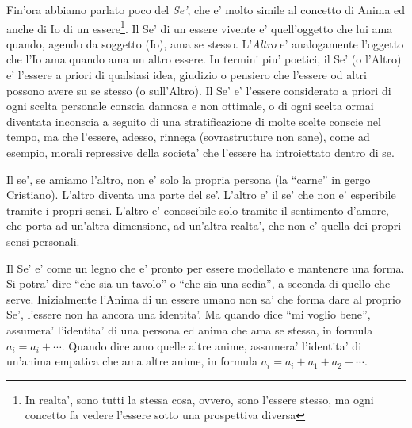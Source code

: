 Fin'ora abbiamo parlato poco del \emph{Se'}, che e' molto simile al concetto di Anima ed anche di Io di un essere\footnote{In realta', sono tutti la stessa cosa, ovvero, sono l'essere stesso, ma ogni concetto fa vedere l'essere sotto una prospettiva diversa}. Il Se' di un essere vivente e' quell'oggetto che lui ama quando, agendo da soggetto (Io), ama se stesso. L'\emph{Altro} e' analogamente l'oggetto che l'Io ama quando ama un altro essere. In termini piu' poetici, il Se' (o l'Altro) e' l'essere a priori di qualsiasi idea, giudizio o pensiero che l'essere od altri possono avere su se stesso (o sull'Altro). Il Se' e' l'essere considerato a priori di ogni scelta personale conscia dannosa e non ottimale, o di ogni scelta ormai diventata inconscia a seguito di una stratificazione di molte scelte conscie nel tempo, ma che l'essere, adesso, rinnega (sovrastrutture non sane), come ad esempio, morali repressive della societa' che l'essere ha introiettato dentro di se. 

Il se', se amiamo l'altro, non e' solo la propria persona (la ``carne'' in gergo Cristiano). L'altro diventa una parte del se'. L'altro e' il se' che non e' esperibile tramite i propri sensi. L'altro e' conoscibile solo tramite il sentimento d'amore, che porta ad un'altra dimensione, ad un'altra realta', che non e' quella dei propri sensi personali. 

Il Se' e' come un legno che e' pronto per essere modellato e mantenere una forma. Si potra' dire ``che sia un tavolo'' o ``che sia una sedia'', a seconda di quello che serve.  Inizialmente l'Anima di un essere umano non sa' che forma dare al proprio Se', l'essere non ha ancora una identita'. Ma quando dice ``mi voglio bene'', assumera' l'identita' di una persona ed anima che ama se stessa, in formula $a_i=a_i+\cdots$. Quando dice amo quelle altre anime, assumera' l'identita' di un'anima empatica che ama altre anime, in formula $a_i=a_i+a_1+a_2+\cdots$. 

